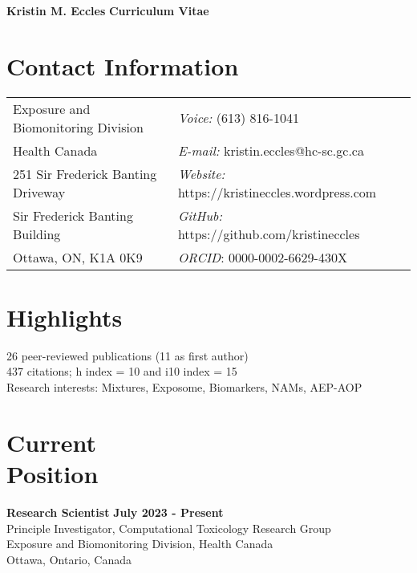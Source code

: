 \documentclass[margin,line]{res}
\begin{document}
\begin{flushleft}
		\huge \textbf{Kristin M. Eccles}
		\hfill {\LARGE \textbf{Curriculum Vitae}}\\
\end{flushleft}

\begin{resume}

\section{\sc Contact Information}
\vspace{.05in}
\begin{tabular}{@{}p{3.2in}p{2.5in}}
Exposure and Biomonitoring Division & {\it Voice:}  (613) 816-1041 \\
Health Canada & {\it E-mail:}  kristin.eccles@hc-sc.gc.ca\\
251 Sir Frederick Banting Driveway&{\it Website:} https://kristineccles.wordpress.com  \\
Sir Frederick Banting Building&{\it GitHub:} https://github.com/kristineccles \\
Ottawa, ON, K1A 0K9 & {\it ORCID}: 0000-0002-6629-430X

\end{tabular}

\vspace*{.1in}
\section{\sc Highlights}
26 peer-reviewed publications (11 as first author)
\\
437 citations; h index = 10 and i10 index = 15
\\
Research interests: Mixtures, Exposome, Biomarkers, NAMs, AEP-AOP

\vspace*{.1in}
\section{\sc Current\\Position}
{\bf  Research Scientist} \hfill {\bf July 2023 - Present}\\
Principle Investigator, Computational Toxicology Research Group\\
Exposure and Biomonitoring Division, Health Canada\\
Ottawa, Ontario, Canada

\vspace*{.1in}

\end{resume}
\end{document}
